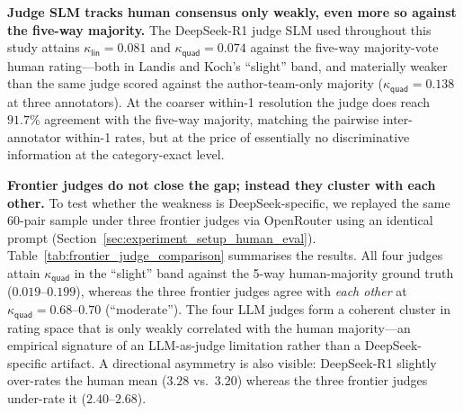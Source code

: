 \textbf{Judge SLM tracks human consensus only weakly, even more so
against the five-way majority.} The DeepSeek-R1 judge SLM used
throughout this study attains
$\kappa_{\textsf{lin}} = 0.081$ and $\kappa_{\textsf{quad}} = 0.074$
against the five-way majority-vote human rating---both in Landis and
Koch's ``slight'' band, and materially weaker than the same judge
scored against the author-team-only majority
($\kappa_{\textsf{quad}} = 0.138$ at three annotators). At the coarser
within-1 resolution the judge does reach $91.7\%$ agreement with the
five-way majority, matching the pairwise inter-annotator within-1 rates,
but at the price of essentially no discriminative information at the
category-exact level.

\textbf{Frontier judges do not close the gap; instead they cluster with
each other.} To test whether the weakness is DeepSeek-specific, we
replayed the same 60-pair sample under three frontier judges via
OpenRouter using an identical prompt (Section~\ref{sec:experiment_setup_human_eval}).
Table~\ref{tab:frontier_judge_comparison} summarises the results. All
four judges attain $\kappa_{\textsf{quad}}$ in the ``slight'' band
against the 5-way human-majority ground truth ($0.019$--$0.199$),
whereas the three frontier judges agree with \emph{each other} at
$\kappa_{\textsf{quad}} = 0.68$--$0.70$ (``moderate''). The four LLM
judges form a coherent cluster in rating space that is only weakly
correlated with the human majority---an empirical signature of an
LLM-as-judge limitation rather than a DeepSeek-specific artifact. A
directional asymmetry is also visible: DeepSeek-R1 slightly over-rates
the human mean ($3.28$ vs.\ $3.20$) whereas the three frontier judges
under-rate it ($2.40$--$2.68$).


